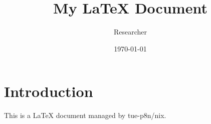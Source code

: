 \documentclass{article}
\title{My LaTeX Document}
\author{Researcher}
\date{\today}
\begin{document}
\maketitle

\section{Introduction}
This is a LaTeX document managed by tue-p8n/nix.
\end{document}
